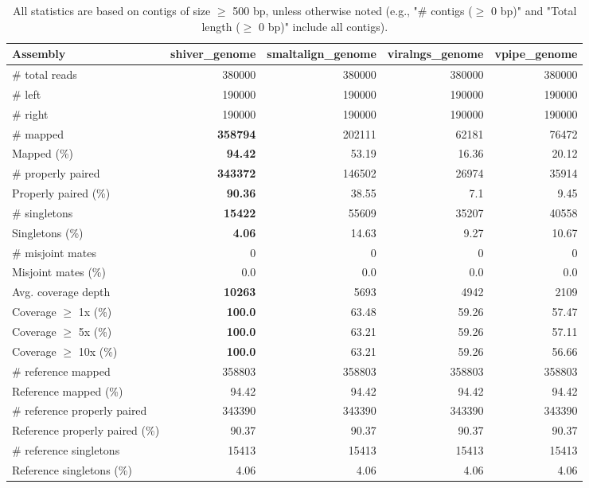 \documentclass[12pt,a4paper]{article}
\begin{document}
\begin{table}[ht]
\begin{center}
\caption{All statistics are based on contigs of size $\geq$ 500 bp, unless otherwise noted (e.g., "\# contigs ($\geq$ 0 bp)" and "Total length ($\geq$ 0 bp)" include all contigs).}
\begin{tabular}{|l*{4}{|r}|}
\hline
Assembly & shiver\_genome & smaltalign\_genome & viralngs\_genome & vpipe\_genome \\ \hline
\# total reads & 380000 & 380000 & 380000 & 380000 \\ \hline
\# left & 190000 & 190000 & 190000 & 190000 \\ \hline
\# right & 190000 & 190000 & 190000 & 190000 \\ \hline
\# mapped & {\bf 358794} & 202111 & 62181 & 76472 \\ \hline
Mapped (\%) & {\bf 94.42} & 53.19 & 16.36 & 20.12 \\ \hline
\# properly paired & {\bf 343372} & 146502 & 26974 & 35914 \\ \hline
Properly paired (\%) & {\bf 90.36} & 38.55 & 7.1 & 9.45 \\ \hline
\# singletons & {\bf 15422} & 55609 & 35207 & 40558 \\ \hline
Singletons (\%) & {\bf 4.06} & 14.63 & 9.27 & 10.67 \\ \hline
\# misjoint mates & 0 & 0 & 0 & 0 \\ \hline
Misjoint mates (\%) & 0.0 & 0.0 & 0.0 & 0.0 \\ \hline
Avg. coverage depth & {\bf 10263} & 5693 & 4942 & 2109 \\ \hline
Coverage $\geq$ 1x (\%) & {\bf 100.0} & 63.48 & 59.26 & 57.47 \\ \hline
Coverage $\geq$ 5x (\%) & {\bf 100.0} & 63.21 & 59.26 & 57.11 \\ \hline
Coverage $\geq$ 10x (\%) & {\bf 100.0} & 63.21 & 59.26 & 56.66 \\ \hline
\# reference mapped & 358803 & 358803 & 358803 & 358803 \\ \hline
Reference mapped (\%) & 94.42 & 94.42 & 94.42 & 94.42 \\ \hline
\# reference properly paired & 343390 & 343390 & 343390 & 343390 \\ \hline
Reference properly paired (\%) & 90.37 & 90.37 & 90.37 & 90.37 \\ \hline
\# reference singletons & 15413 & 15413 & 15413 & 15413 \\ \hline
Reference singletons (\%) & 4.06 & 4.06 & 4.06 & 4.06 \\ \hline

\end{tabular}
\end{center}
\end{table}
\end{document}
